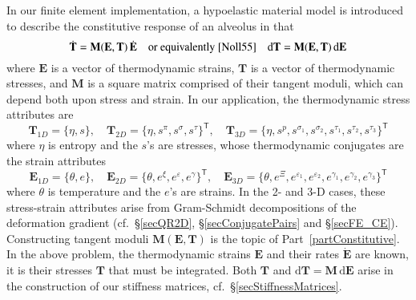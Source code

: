 In our finite element implementation, a hypo\-elastic material model \cite{Truesdell55} is introduced to describe the constitutive response of an alveolus in that
\begin{displaymath}
    \dot{\mathbf{T}} = \mathbf{M} ( \mathbf{E} , \mathbf{T} ) \, \dot{\mathbf{E}} 
    \quad \text{or equivalently \cite{Noll55}} \quad
    \mathrm{d} \mathbf{T} = \mathbf{M} ( \mathbf{E} , \mathbf{T} ) \, \mathrm{d} \mathbf{E}
\end{displaymath} 
where $\mathbf{E}$ is a vector of thermo\-dynamic strains, $\mathbf{T}$ is a vector of thermo\-dynamic stresses, and $\mathbf{M}$ is a square matrix comprised of their tangent moduli, which can depend both upon stress and strain.  In our application, the thermo\-dynamic stress attributes are 
\begin{displaymath}
   \mathbf{T}_{1D} = \{ \eta , s \} , \quad
   \mathbf{T}_{2D} = \{ \eta , s^{\pi} , s^{\sigma} , s^{\tau} \}^{\mathsf{T}} , \quad
   \mathbf{T}_{3D} = \{ \eta , s^{p} , s^{\sigma_1} , s^{\sigma_2} , s^{\tau_1} , s^{\tau_2} , s^{\tau_3} \}^{\mathsf{T}}
\end{displaymath}
where $\eta$ is entropy and the $s$'s are stresses, whose thermo\-dynamic conjugates are the strain attributes
\begin{displaymath}
\mathbf{E}_{1D} = \{ \theta , e \} , \quad
\mathbf{E}_{2D} = \{ \theta , e^{\xi} , e^{\varepsilon} , e^{\gamma} \}^{\mathsf{T}} , \quad
\mathbf{E}_{3D} = \{ \theta , e^{\Xi} , e^{\varepsilon_1} , e^{\varepsilon_2} , e^{\gamma_1} , e^{\gamma_2} , e^{\gamma_3} \}^{\mathsf{T}}
\end{displaymath}
where $\theta$ is temperature and the $e$'s are strains.  In the 2- and 3-D cases, these stress-strain attributes arise from Gram-Schmidt decompositions of the deformation gradient (cf.\ \S\ref{secQR2D}, \S\ref{secConjugatePairs} and \S\ref{secFE_CE}).  Constructing tangent moduli $\mathbf{M} ( \mathbf{E} , \mathbf{T} )$ is the topic of Part~\ref{partConstitutive}.  In the above problem, the thermo\-dynamic strains $\mathbf{E}$ and their rates $\dot{\mathbf{E}}$ are known, it is their stresses $\mathbf{T}$ that must be integrated.  Both $\mathbf{T}$ and $\mathrm{d} \mathbf{T} = \mathbf{M} \, \mathrm{d} \mathbf{E}$ arise in the construction of our stiffness matrices, cf.\ \S\ref{secStiffnessMatrices}.

